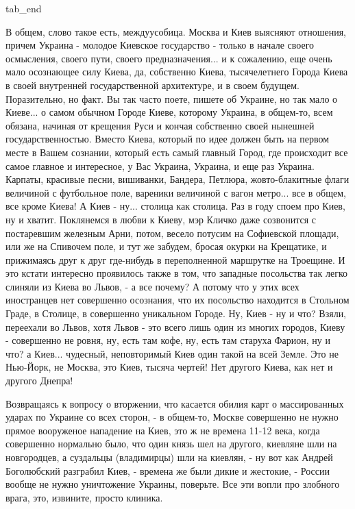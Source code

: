   tab_end
\fi

В общем, слово такое есть, междуусобица.  Москва и Киев выясняют отношения,
причем Украина - молодое Киевское государство - только в начале своего
осмысления, своего пути, своего предназначения... и к сожалению, еще очень мало
осознающее силу Киева, да, собственно Киева, тысячелетнего Города Киева в своей
внутренней государственной архитектуре, и в своем будущем. Поразительно, но
факт. Вы так часто поете, пишете об Украине, но так мало о Киеве... о самом
обычном Городе Киеве, которому Украина, в общем-то, всем обязана, начиная от
крещения Руси и кончая собственно своей нынешней государственностью. Вместо
Киева, который по идее должен быть на первом месте в Вашем сознании, который
есть самый главный Город, где происходит все самое главное и интересное, у Вас
Украина, Украина, и еще раз Украина. Карпаты, красивые песни, вишиванки,
Бандера, Петлюра, жовто-блакитные флаги величиной с футбольное поле, вареники
величиной с вагон метро... все в общем, все кроме Киева!  А Киев - ну...
столица как столица. Раз в году споем про Киев, ну и хватит. Поклянемся в любви
к Киеву, мэр Кличко даже созвонится с постаревшим железным Арни, потом, весело
потусим на Софиевской площади, или же на Спивочем поле, и тут же забудем,
бросая окурки на Крещатике, и прижимаясь друг к друг где-нибудь в переполненной
маршрутке на Троещине. И это кстати интересно проявилось также в том, что
западные посольства так легко слиняли из Киева во Львов, -  а все почему? А
потому что у этих всех иностранцев нет совершенно осознания, что их посольство
находится в Стольном Граде, в Столице, в совершенно уникальном Городе. Ну, Киев
- ну и что?  Взяли, переехали во Львов, хотя Львов - это всего лишь один из
многих городов, Киеву - совершенно не ровня, ну, есть там кофе, ну, есть там
старуха Фарион, ну и что? а Киев... чудесный, неповторимый Киев один такой на
всей Земле. Это не Нью-Йорк, не Москва, это Киев, тысяча чертей!  Нет другого
Киева, как нет и другого Днепра!

Возвращаясь к вопросу о вторжении, что касается обилия карт о массированных
ударах по Украине со всех сторон, -  в общем-то, Москве совершенно не нужно
прямое вооруженое нападение на Киев, это ж не времена 11-12 века, когда
совершенно нормально было, что один князь шел на другого, киевляне шли на
новгородцев, а суздальцы (владимирцы) шли на киевлян, - ну вот как Андрей
Боголюбский разграбил Киев, - времена же были дикие и жестокие, - России вообще
не нужно уничтожение Украины, поверьте. Все эти вопли про злобного врага, это,
извините, просто клиника. 

